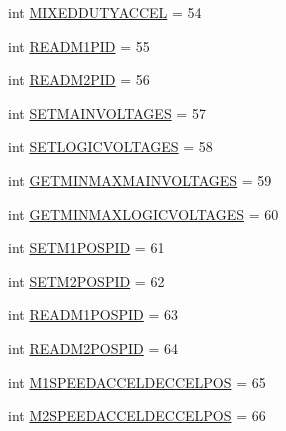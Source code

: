 \begin{DoxyCompactItemize}
\item 
int \mbox{\hyperlink{classtoxic__hardware_1_1roboclaw__3_1_1Roboclaw_1_1Cmd_a90760f994a82bf29c7dce267809fc53f}{M\+I\+X\+E\+D\+D\+U\+T\+Y\+A\+C\+C\+EL}} = 54
\item 
int \mbox{\hyperlink{classtoxic__hardware_1_1roboclaw__3_1_1Roboclaw_1_1Cmd_a4b160e11dcc7fce108996fc7b73988bf}{R\+E\+A\+D\+M1\+P\+ID}} = 55
\item 
int \mbox{\hyperlink{classtoxic__hardware_1_1roboclaw__3_1_1Roboclaw_1_1Cmd_afcb1ce02ede2d4a11ef044017b7df62b}{R\+E\+A\+D\+M2\+P\+ID}} = 56
\item 
int \mbox{\hyperlink{classtoxic__hardware_1_1roboclaw__3_1_1Roboclaw_1_1Cmd_a2ae5605f820e3846ea5854bf74dd9a02}{S\+E\+T\+M\+A\+I\+N\+V\+O\+L\+T\+A\+G\+ES}} = 57
\item 
int \mbox{\hyperlink{classtoxic__hardware_1_1roboclaw__3_1_1Roboclaw_1_1Cmd_a12fa895e88adfe911799fefbe6a24ea5}{S\+E\+T\+L\+O\+G\+I\+C\+V\+O\+L\+T\+A\+G\+ES}} = 58
\item 
int \mbox{\hyperlink{classtoxic__hardware_1_1roboclaw__3_1_1Roboclaw_1_1Cmd_a371c46088a7d76f11306c9e74ffc9976}{G\+E\+T\+M\+I\+N\+M\+A\+X\+M\+A\+I\+N\+V\+O\+L\+T\+A\+G\+ES}} = 59
\item 
int \mbox{\hyperlink{classtoxic__hardware_1_1roboclaw__3_1_1Roboclaw_1_1Cmd_a16f67765c09e5c136fff72d30b50cced}{G\+E\+T\+M\+I\+N\+M\+A\+X\+L\+O\+G\+I\+C\+V\+O\+L\+T\+A\+G\+ES}} = 60
\item 
int \mbox{\hyperlink{classtoxic__hardware_1_1roboclaw__3_1_1Roboclaw_1_1Cmd_a51f15162c2c690d760415ddb20a12680}{S\+E\+T\+M1\+P\+O\+S\+P\+ID}} = 61
\item 
int \mbox{\hyperlink{classtoxic__hardware_1_1roboclaw__3_1_1Roboclaw_1_1Cmd_adc37ab96c5ba37c298cb5f8d2df7cd06}{S\+E\+T\+M2\+P\+O\+S\+P\+ID}} = 62
\item 
int \mbox{\hyperlink{classtoxic__hardware_1_1roboclaw__3_1_1Roboclaw_1_1Cmd_a6f0db6750f2f2e720deec2086ef29ed0}{R\+E\+A\+D\+M1\+P\+O\+S\+P\+ID}} = 63
\item 
int \mbox{\hyperlink{classtoxic__hardware_1_1roboclaw__3_1_1Roboclaw_1_1Cmd_a3a94ad96d31a215bc7edf68001ed3be2}{R\+E\+A\+D\+M2\+P\+O\+S\+P\+ID}} = 64
\item 
int \mbox{\hyperlink{classtoxic__hardware_1_1roboclaw__3_1_1Roboclaw_1_1Cmd_a10674481f4a98e4d62d390e80f4072d6}{M1\+S\+P\+E\+E\+D\+A\+C\+C\+E\+L\+D\+E\+C\+C\+E\+L\+P\+OS}} = 65
\item 
int \mbox{\hyperlink{classtoxic__hardware_1_1roboclaw__3_1_1Roboclaw_1_1Cmd_ad5c8ed695c618fcd1a34eff386e69168}{M2\+S\+P\+E\+E\+D\+A\+C\+C\+E\+L\+D\+E\+C\+C\+E\+L\+P\+OS}} = 66

\end{DoxyCompactItemize}

